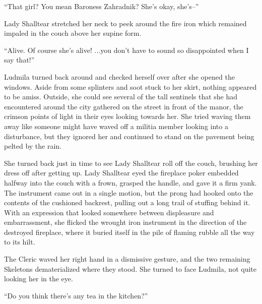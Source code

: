  

“That girl? You mean Baroness Zahradnik? She’s okay, she’s–”

 

Lady Shalltear stretched her neck to peek around the fire iron which remained impaled in the couch above her supine form.

 

“Alive. Of course she’s alive! ...you don’t have to sound so disappointed when I say that!”

 

Ludmila turned back around and checked herself over after she opened the windows. Aside from some splinters and soot stuck to her skirt, nothing appeared to be amiss. Outside, she could see several of the tall sentinels that she had encountered around the city gathered on the street in front of the manor, the crimson points of light in their eyes looking towards her. She tried waving them away like someone might have waved off a militia member looking into a disturbance, but they ignored her and continued to stand on the pavement being pelted by the rain.

 

She turned back just in time to see Lady Shalltear roll off the couch, brushing her dress off after getting up. Lady Shalltear eyed the fireplace poker embedded halfway into the couch with a frown, grasped the handle, and gave it a firm yank. The instrument came out in a single motion, but the prong had hooked onto the contents of the cushioned backrest, pulling out a long trail of stuffing behind it. With an expression that looked somewhere between displeasure and embarrassment, she flicked the wrought iron instrument in the direction of the destroyed fireplace, where it buried itself in the pile of flaming rubble all the way to its hilt.

 

The Cleric waved her right hand in a dismissive gesture, and the two remaining Skeletons dematerialized where they stood. She turned to face Ludmila, not quite looking her in the eye.

 

“Do you think there’s any tea in the kitchen?”